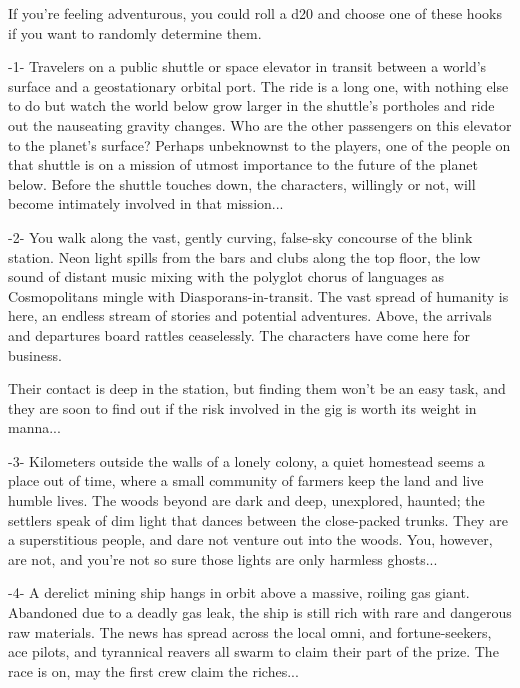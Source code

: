If you’re feeling adventurous, you could roll a d20 and choose one of these hooks if you want to
randomly determine them.


                                                     -1-
Travelers on a public shuttle or space elevator in transit between a world’s surface and a
geostationary orbital port. The ride is a long one, with nothing else to do but watch the world
below grow larger in the shuttle’s portholes and ride out the nauseating gravity changes. Who are
the other passengers on this elevator to the planet’s surface? Perhaps unbeknownst to the
players, one of the people on that shuttle is on a mission of utmost importance to the future of
the planet below. Before the shuttle touches down, the characters, willingly or not, will become
intimately involved in that mission...

                                                     -2-
You walk along the vast, gently curving, false-sky concourse of the blink station. Neon light spills
from the bars and clubs along the top floor, the low sound of distant music mixing with the
polyglot chorus of languages as Cosmopolitans mingle with Diasporans-in-transit. The vast
spread of humanity is here, an endless stream of stories and potential adventures. Above, the
arrivals and departures board rattles ceaselessly. The characters have come here for business.




Their contact is deep in the station, but finding them won’t be an easy task, and they are soon to
find out if the risk involved in the gig is worth its weight in manna...

                                                     -3-
Kilometers outside the walls of a lonely colony, a quiet homestead seems a place out of time,
where a small community of farmers keep the land and live humble lives. The woods beyond are
dark and deep, unexplored, haunted; the settlers speak of dim light that dances between the
close-packed trunks. They are a superstitious people, and dare not venture out into the woods.
You, however, are not, and you’re not so sure those lights are only harmless ghosts...

                                                     -4-
A derelict mining ship hangs in orbit above a massive, roiling gas giant. Abandoned due to a
deadly gas leak, the ship is still rich with rare and dangerous raw materials. The news has spread
across the local omni, and fortune-seekers, ace pilots, and tyrannical reavers all swarm to claim
their part of the prize. The race is on, may the first crew claim the riches...

